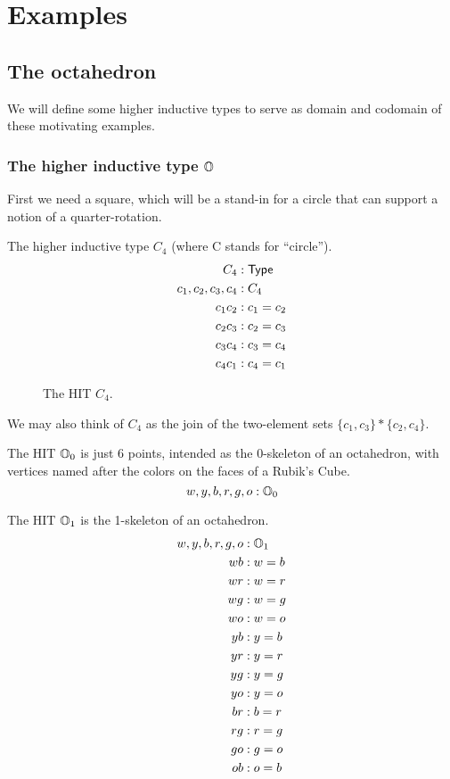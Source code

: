 \section{Examples}
\subsection{The octahedron}

We will define some higher inductive types to serve as domain and codomain of these motivating examples.

\subsubsection{The higher inductive type \( \mathbb{O} \)}

First we need a square, which will be a stand-in for a circle that can support a notion of a quarter-rotation. 

\begin{mydef}
The higher inductive type \( C_4 \) (where C stands for ``circle'').
\begin{align*}
C_4 &: \mathsf{Type} \\
c_1, c_2, c_3, c_4 &: C_4 \\
c_1c_2 &: c_1 = c_2 \\
c_2c_3 &: c_2 = c_3 \\
c_3c_4 &: c_3 = c_4 \\
c_4c_1 &: c_4 = c_1 \\
\end{align*}
\end{mydef}

\begin{figure}[h]
\centering

\caption{The HIT \( C_4 \).}
\end{figure}

We may also think of \( C_4 \) as the join of the two-element sets \( \{c_1, c_3\}* \{c_2, c_4\} \).

\begin{mydef}
The HIT \( \mathbb{O}_0 \) is just 6 points, intended as the 0-skeleton of an octahedron, with vertices named after the colors on the faces of a Rubik's Cube.
\[ w, y, b, r, g, o : \mathbb{O}_0 \]
\end{mydef}

\begin{mydef}
The HIT \( \mathbb{O}_1 \) is the 1-skeleton of an octahedron.
\begin{align*}
w, y, b, r, g, o &: \mathbb{O}_1 \\
wb &: w=b \\
wr &: w=r \\
wg &: w=g \\
wo &: w=o \\
yb &: y=b \\
yr &: y=r \\
yg &: y=g \\
yo &: y=o \\
br &: b=r \\
rg &: r=g \\
go &: g=o \\
ob &: o=b 
\end{align*}
\end{mydef}

